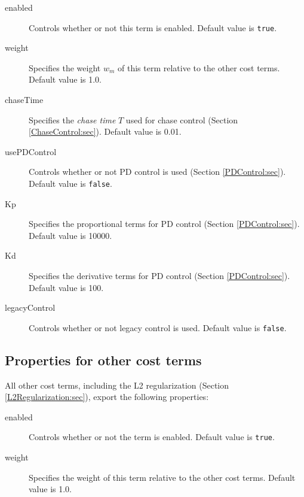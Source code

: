 \begin{description}

\item[enabled]\mbox{}

Controls whether or not this term is enabled. Default value is {\tt true}.

\item[weight]\mbox{}

Specifies the weight $w_m$ of this term relative to the other cost
terms. Default value is 1.0.

\item[chaseTime]\mbox{}

Specifies the {\it chase time} $T$ used for chase control
(Section \ref{ChaseControl:sec}). Default value is 0.01.

\item[usePDControl]\mbox{}

Controls whether or not PD control is used
(Section \ref{PDControl:sec}). Default value is {\tt false}.

\item[Kp]\mbox{}

Specifies the proportional terms for PD control
(Section \ref{PDControl:sec}). Default value is 10000.

\item[Kd]\mbox{}

Specifies the derivative terms for PD control
(Section \ref{PDControl:sec}). Default value is 100.

\item[legacyControl]\mbox{}

Controls whether or not legacy control is used.
Default value is {\tt false}.

\end{description}

\subsection{Properties for other cost terms}

All other cost terms, including the L2 regularization (Section
\ref{L2Regularization:sec}), export the following properties:

\begin{description}

\item[enabled]\mbox{}

Controls whether or not the term is enabled. Default value is {\tt true}.

\item[weight]\mbox{}

Specifies the weight of this term relative to the other cost terms. Default
value is 1.0.

\end{description}

